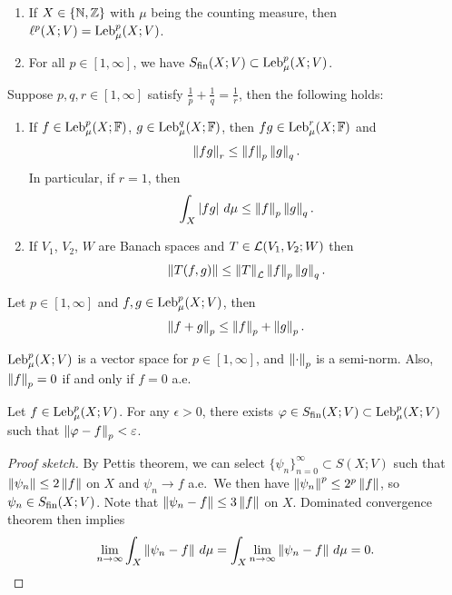 \documentclass[a4paper]{article}
\renewcommand{\seqinfn}[1]{\{ #1 \}_{n=0}^\infty}
\begin{document}
\begin{eg}
  \begin{enumerate}
    \item If $X \in \{\mathbb{N}, \mathbb{Z}\}$ with $\mu$ being the counting measure,
          then $\ell^p(X; V) = \operatorname{Leb}_\mu^p (X; V)$.

    \item For all $p \in [1, \infty]$, we have $S_{\text{fin}}(X; V) \subset
          \operatorname{Leb}_\mu^p (X; V)$.
  \end{enumerate}
\end{eg}

\begin{thm}
  Suppose $p, q, r \in [1, \infty]$ satisfy $\frac{1}{p} + \frac{1}{q}
    = \frac{1}{r}$, then the following holds:
  \begin{enumerate}
    \item If $f \in \operatorname{Leb}_\mu^p(X; \mathbb{F})$, $g \in \operatorname{Leb}_\mu^q (X; \mathbb{F})$, then
          $f g \in \operatorname{Leb}_\mu^r (X; \mathbb{F})$ and
          \[
            \left\lVert f g\right\rVert_r \leq \left\lVert f\right\rVert_p \left\lVert g\right\rVert_q.
          \]
          In particular, if $r = 1$, then
          \[
            \int_X \left\lvert f g\right\rvert \, d \mu \leq \left\lVert f\right\rVert_p \left\lVert g\right\rVert_q.
          \]

    \item If $V_1$, $V_2$, $W$ are Banach spaces and $T \in \mathcal{L}(V_1, V_2 ;
          W)$ then
          \[
            \left\lVert T (f, g)\right\rVert \leq \left\lVert T\right\rVert_{\mathcal{L}} \left\lVert f\right\rVert_p \left\lVert g\right\rVert_q.
          \]
  \end{enumerate}
\end{thm}

\begin{thm}
  Let $p \in [1, \infty]$ and $f, g \in \operatorname{Leb}_\mu^p(X ; V)$, then
  \[
    \left\lVert f + g\right\rVert_p \leq \left\lVert f\right\rVert_p + \left\lVert g\right\rVert_p.
  \]
\end{thm}

\begin{cor}
  $\operatorname{Leb}_\mu^p(X; V)$ is a vector space for $p \in [1, \infty]$,
  and $\left\lVert \cdot\right\rVert_p$ is a semi-norm. Also,
  $\left\lVert f\right\rVert_p = 0$ if and only if $f = 0$ a.e.\
\end{cor}

\begin{thm}
  Let $f \in \operatorname{Leb}_\mu^p (X; V)$. For any $\epsilon > 0$, there exists
  $\varphi \in S_{\text{fin}}(X; V) \subset \operatorname{Leb}_\mu^p (X; V)$ such that $\left\lVert \varphi -
      f\right\rVert_p < \varepsilon$.
\end{thm}

\begin{proof}[Proof sketch]
  By Pettis theorem, we can select $\seqinfn{\psi_n} \subset
    S(X; V)$ such that $\left\lVert \psi_n\right\rVert \leq 2 \left\lVert f\right\rVert$
  on $X$ and $\psi_n \to f$ a.e.\ We then have
  $\left\lVert \psi_n\right\rVert^p \leq 2^p \left\lVert f\right\rVert$, so $\psi_n
    \in S_{\text{fin}}(X ; V)$. Note that $\left\lVert \psi_n - f\right\rVert \leq
    3 \left\lVert f\right\rVert$ on $X$. Dominated convergence theorem then implies
  \[
    \lim_{n \to \infty} \int_X \left\lVert \psi_n - f\right\rVert \, d \mu
    = \int_X \lim_{n \to \infty} \left\lVert \psi_n - f\right\rVert \, d \mu
    = 0.
  \]
\end{proof}
\end{document}
